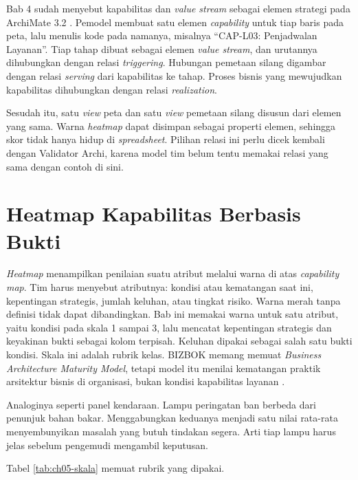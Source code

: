 \begin{pendalaman}[title={Pendalaman Teknis (opsional): Memodelkan Peta di Archi}]
  Bab 4 sudah menyebut kapabilitas dan \textit{value stream} sebagai elemen strategi pada ArchiMate
  3.2 \cite{archimate32}. Pemodel membuat satu elemen \textit{capability} untuk tiap baris pada
  peta, lalu menulis kode pada namanya, misalnya ``CAP-L03: Penjadwalan Layanan''. Tiap tahap dibuat
  sebagai elemen \textit{value stream}, dan urutannya dihubungkan dengan relasi \textit{triggering}.
  Hubungan pemetaan silang digambar dengan relasi \textit{serving} dari kapabilitas ke tahap.
  Proses bisnis yang mewujudkan kapabilitas dihubungkan dengan relasi \textit{realization}.

  Sesudah itu, satu \textit{view} peta dan satu \textit{view} pemetaan silang disusun dari elemen yang
  sama. Warna \textit{heatmap} dapat disimpan sebagai properti elemen, sehingga skor tidak hanya hidup
  di \textit{spreadsheet}. Pilihan relasi ini perlu dicek kembali dengan Validator Archi, karena model
  tim belum tentu memakai relasi yang sama dengan contoh di sini.
\end{pendalaman}

\section{Heatmap Kapabilitas Berbasis Bukti}

\textit{Heatmap} menampilkan penilaian suatu atribut melalui warna di atas \textit{capability map}.
Tim harus menyebut atributnya: kondisi atau kematangan saat ini, kepentingan strategis, jumlah keluhan,
atau tingkat risiko. Warna merah tanpa definisi tidak dapat dibandingkan. Bab ini memakai warna untuk satu
atribut, yaitu kondisi pada skala 1 sampai 3, lalu mencatat kepentingan strategis dan keyakinan bukti sebagai
kolom terpisah. Keluhan dipakai sebagai salah satu bukti kondisi. Skala ini adalah rubrik kelas. BIZBOK memang memuat \textit{Business Architecture
Maturity Model}, tetapi model itu menilai kematangan praktik arsitektur bisnis di organisasi, bukan
kondisi kapabilitas layanan \cite{bizbok15}.

Analoginya seperti panel kendaraan. Lampu peringatan ban berbeda dari penunjuk bahan bakar. Menggabungkan
keduanya menjadi satu nilai rata-rata menyembunyikan masalah yang butuh tindakan segera. Arti tiap lampu
harus jelas sebelum pengemudi mengambil keputusan.

Tabel \ref{tab:ch05-skala} memuat rubrik yang dipakai.

